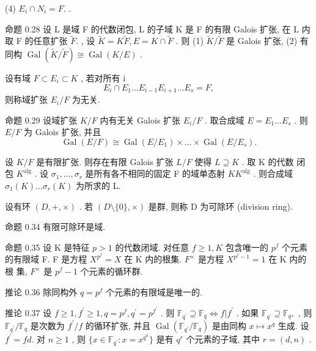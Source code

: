 \documentclass[]{article}
\begin{document}
{(4) $E _ { i } \cap N _ { i } = F .$ . 

命题 0.28 设 L 是域 F 的代数闭包, L 的子域 K 是 F 的有限 Galois 扩张, 在 L 内 取 F 的任意扩张 $\tilde { F } .$ , 设 $\tilde { K } = K \tilde { F } , E = K \cap \tilde { F }$ . 则 (1) $\tilde { K } / \tilde { F }$ 是 Galois 扩张, (2) 有同构 $\operatorname { G a l } ( { \tilde { K } } / { \tilde { F } } ) \cong \operatorname { G a l } ( K / E )$ . 

设有域 $F \subset E _ { i } \subset K$ , 若对所有 i $$
E _ {i} \cap E _ {1} \dots E _ {i - 1} E _ {i + 1} \dots E _ {s} = F,
$$则称域扩张 $E _ { i } / F$ 为无关. 

命题 0.29 设域扩张 $K / F$ 内有无关 Galois 扩张 $E _ { i } / F$ . 取合成域 $E = E _ { 1 } \dots E _ { s }$ . 则 $E / F$ 为 Galois 扩张, 并且$$
\operatorname{Gal} (E / F) \cong \operatorname{Gal} (E / E _ {1}) \times \dots \times \operatorname{Gal} (E / E _ {s}).
$$

设 $K / F$ 是有限扩张. 则存在有限 Galois 扩张 $L / F$ 使得 $L \supseteq K$ . 取 K 的代数 闭包 $K ^ { \mathrm { a l g } }$ . 设 $\sigma _ { 1 } , \ldots , \sigma _ { r }$ 是所有各不相同的固定 F 的域单态射 $K  K ^ { \mathrm { a l g } }$ . 则合成域 $\sigma _ { 1 } ( K ) \ldots \sigma _ { r } ( K )$ 为所求的 L.

设有环 $( D , + , \times )$ . 若 $( D \setminus \{ 0 \} , \times )$ 是群, 则称 D 为可除环 (division ring). 

命题 0.34 有限可除环是域. 

命题 0.35 设 K 是特征 $p > 1$ 的代数闭域. 对任意 $f \geqslant 1 , K$ 包含唯一的 $p ^ { f }$ 个元素 的有限域 F. F 是方程 $X ^ { p ^ { f } } = X$ 在 K 内的根集. $F ^ { \times }$ 是方程 $X ^ { p ^ { f } - 1 } = 1$ 在 K 内的根 集, $F ^ { \times }$ 是 $p ^ { f } - 1$ 个元素的循环群. 

推论 0.36 除同构外 $q = p ^ { f }$ 个元素的有限域是唯一的. 

推论 0.37 设 $f \geqslant 1 , f ^ { \prime } \geqslant 1 , q = p ^ { f } , q ^ { \prime } = p ^ { f ^ { \prime } }$ . 则 $\mathbb { F } _ { q ^ { \prime } } \supseteq \mathbb { F } _ { q } \Leftrightarrow f | f ^ { \prime }$ . 如果 $\mathbb { F } _ { q ^ { \prime } } \supseteq \mathbb { F } _ { q } ,$ , 则 $\mathbb { F } _ { q ^ { \prime } } / \mathbb { F } _ { q }$ 是次数为 $f ^ { \prime } / f$ 的循环扩张, 并且 $\operatorname { G a l } ( \mathbb { F } _ { q ^ { \prime } } / \mathbb { F } _ { q } )$ 是由同构 $x \mapsto x ^ { q }$ 生成. 设 $f ^ { \prime } = f d .$ 对 $n \geqslant 1$ , 则 $\{ x \in \mathbb { F } _ { q ^ { \prime } } : x = x ^ { q ^ { n } } \}$ 是有 $q ^ { r }$ 个元素的子域, 其中 $r = ( d , n )$ . 

}
\end{document}
